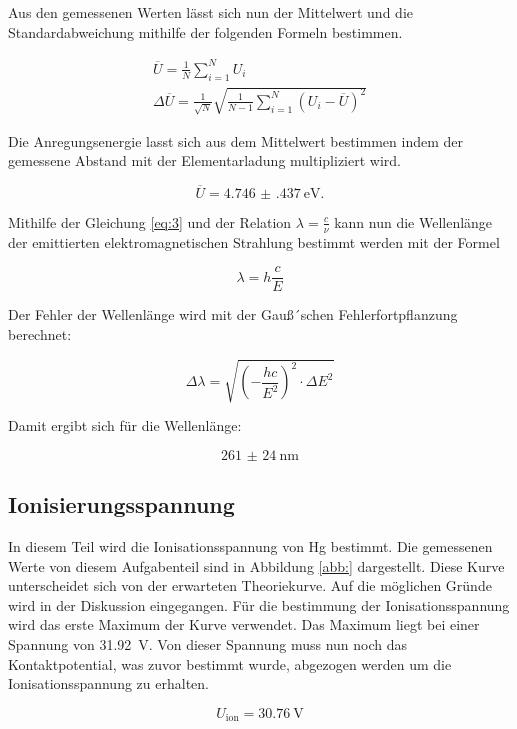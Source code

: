 Aus den gemessenen Werten lässt sich nun der Mittelwert und die Standardabweichung
mithilfe der folgenden Formeln bestimmen.

\begin{gather*}
  \overline{U} = \frac{1}{N} \sum^N_{i=1} U_i \\
  \Delta \overline{U} = \frac{1}{\sqrt{N}} \sqrt{\frac{1}{N-1} \sum^N_{i=1}(U_i-\overline{U})^2}
\end{gather*}

Die Anregungsenergie lasst sich aus dem Mittelwert bestimmen indem der gemessene Abstand
mit der Elementarladung multipliziert wird.

\begin{equation*}
  \overline{U} = \SI{4.746(437)}{\electronvolt}.
\end{equation*}

Mithilfe der Gleichung \ref{eq:3} und der Relation $\lambda = \frac{c}{\nu}$ kann
nun die Wellenlänge der emittierten elektromagnetischen Strahlung bestimmt werden
mit der Formel

\begin{equation*}
  \lambda = h \frac{c}{E}
\end{equation*}

Der Fehler der Wellenlänge wird mit der Gauß´schen Fehlerfortpflanzung berechnet:

\begin{equation*}
  \Delta \lambda = \sqrt{\left(-\frac{hc}{E^2}\right)^2 \cdot \Delta E^2}
\end{equation*}

Damit ergibt sich für die Wellenlänge:

\begin{equation*}
  \SI{261(24)}{\nano\meter}
\end{equation*}

\subsection{Ionisierungsspannung}

In diesem Teil wird die Ionisationsspannung von Hg bestimmt. Die gemessenen Werte
von diesem Aufgabenteil sind in Abbildung \ref{abb:} dargestellt. Diese Kurve unterscheidet sich
von der erwarteten Theoriekurve. Auf die möglichen Gründe wird in der Diskussion eingegangen.
Für die bestimmung der Ionisationsspannung wird das erste Maximum der Kurve verwendet.
Das Maximum liegt bei einer Spannung von \SI{31.92}{\volt}. Von dieser Spannung muss nun noch
das Kontaktpotential, was zuvor bestimmt wurde, abgezogen werden um die Ionisationsspannung
zu erhalten.

\begin{equation*}
  U_\text{ion} = \SI{30.76}{\volt}
\end{equation*}
